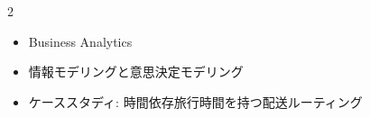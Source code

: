 \clearpage
{}
\begin{multicols}{2}\scriptsize\raggedcolumns
{}
\begin{itemize}
\item Business Analytics
\item 情報モデリングと意思決定モデリング
\item ケーススタディ: 時間依存旅行時間を持つ配送ルーティング
\end{itemize}
\end{multicols}
